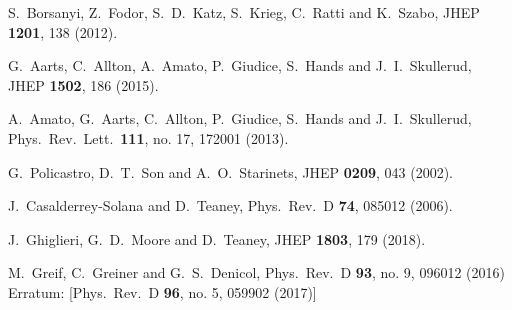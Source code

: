 \begin{thebibliography}{99}
  S.~Borsanyi, Z.~Fodor, S.~D.~Katz, S.~Krieg, C.~Ratti and K.~Szabo,
  JHEP {\bf 1201}, 138 (2012).

  G.~Aarts, C.~Allton, A.~Amato, P.~Giudice, S.~Hands and J.~I.~Skullerud,
  JHEP {\bf 1502}, 186 (2015).

  A.~Amato, G.~Aarts, C.~Allton, P.~Giudice, S.~Hands and J.~I.~Skullerud,
  Phys.\ Rev.\ Lett.\  {\bf 111}, no. 17, 172001 (2013).

  G.~Policastro, D.~T.~Son and A.~O.~Starinets,
  JHEP {\bf 0209}, 043 (2002).

  J.~Casalderrey-Solana and D.~Teaney,
  Phys.\ Rev.\ D {\bf 74}, 085012 (2006).

  J.~Ghiglieri, G.~D.~Moore and D.~Teaney,
  JHEP {\bf 1803}, 179 (2018).
  
  
  M.~Greif, C.~Greiner and G.~S.~Denicol,
  Phys.\ Rev.\ D {\bf 93}, no. 9, 096012 (2016)
  Erratum: [Phys.\ Rev.\ D {\bf 96}, no. 5, 059902 (2017)]
  

\end{thebibliography}
